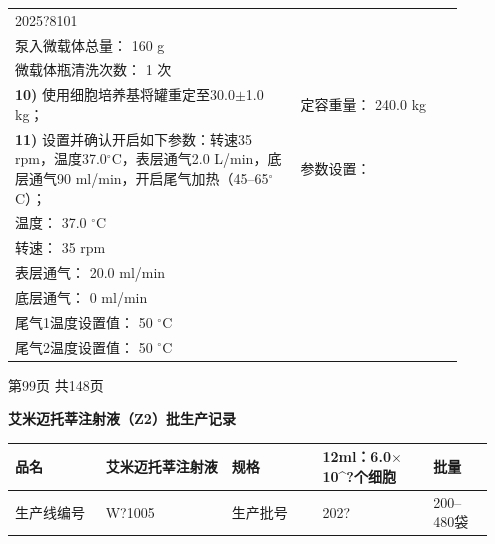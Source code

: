 \documentclass[UTF8,10pt,a4paper,fontset=fandol]{ctexart}
\newcommand{\fieldvalue}[1]{#1}
\newcommand{\handwritten}[1]{#1}
\begin{document}
\begin{tabular}{|p{0.57\linewidth}|p{0.32\linewidth}|}
\fieldvalue{\handwritten{2025?8101}}\\
泵入微载体总量：
\fieldvalue{\handwritten{160}} g\\
微载体瓶清洗次数：
\fieldvalue{\handwritten{1}} 次\\
\hline
\textbf{10)} 使用细胞培养基将罐重定至30.0$\pm$1.0 kg； &
定容重量：
\fieldvalue{\handwritten{240.0}} kg\\
\hline
\textbf{11)} 设置并确认开启如下参数：转速35 rpm，温度37.0$^\circ$C，表层通气2.0 L/min，底层通气90 ml/min，开启尾气加热（45--65$^\circ$C）； &
参数设置：\\
温度：
\fieldvalue{\handwritten{37.0}} $^\circ$C\\
转速：
\fieldvalue{\handwritten{35}} rpm\\
表层通气：
\fieldvalue{\handwritten{20.0}} ml/min\\
底层通气：
\fieldvalue{\handwritten{0}} ml/min\\
尾气1温度设置值：
\fieldvalue{\handwritten{50}} $^\circ$C\\
尾气2温度设置值：
\fieldvalue{\handwritten{50}} $^\circ$C\\
\hline
\end{tabular}

\begin{center}
第99页 共148页
\end{center}

\newpage

\begin{center}
\textbf{艾米迈托莘注射液（Z2）批生产记录}
\end{center}

\begin{tabular}{|p{0.18\linewidth}|p{0.25\linewidth}|p{0.18\linewidth}|p{0.22\linewidth}|p{0.12\linewidth}|}
\hline
品名 &
\fieldvalue{艾米迈托莘注射液} &
规格 &
\fieldvalue{12ml：6.0$\times$10^{?}个细胞} &
批量 \\
\hline
生产线编号 &
\fieldvalue{\handwritten{W?1005}} &
生产批号 &
\fieldvalue{\handwritten{202?}} &
200--480袋 \\
\hline
\end{tabular}
\end{document}
